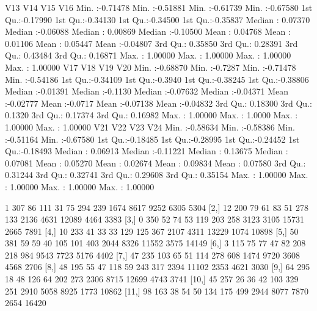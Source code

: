 \documentclass[a4paper]{ article}
\begin{document}
\begin{table}[H]
\begin{Schunk}
\begin{Soutput}
      V13                V14                V15                V16          
 Min.   :-0.71478   Min.   :-0.51881   Min.   :-0.61739   Min.   :-0.67580  
 1st Qu.:-0.17990   1st Qu.:-0.34130   1st Qu.:-0.34500   1st Qu.:-0.35837  
 Median : 0.07370   Median :-0.06088   Median : 0.00869   Median :-0.10500  
 Mean   : 0.04768   Mean   : 0.01106   Mean   : 0.05447   Mean   :-0.04807  
 3rd Qu.: 0.35850   3rd Qu.: 0.28391   3rd Qu.: 0.43484   3rd Qu.: 0.16871  
 Max.   : 1.00000   Max.   : 1.00000   Max.   : 1.00000   Max.   : 1.00000  
      V17                V18               V19                V20          
 Min.   :-0.68870   Min.   :-0.7287   Min.   :-0.71478   Min.   :-0.54186  
 1st Qu.:-0.34109   1st Qu.:-0.3940   1st Qu.:-0.38245   1st Qu.:-0.38806  
 Median :-0.01391   Median :-0.1130   Median :-0.07632   Median :-0.04371  
 Mean   :-0.02777   Mean   :-0.0717   Mean   :-0.07138   Mean   :-0.04832  
 3rd Qu.: 0.18300   3rd Qu.: 0.1320   3rd Qu.: 0.17374   3rd Qu.: 0.16982  
 Max.   : 1.00000   Max.   : 1.0000   Max.   : 1.00000   Max.   : 1.00000  
      V21                V22                V23                V24          
 Min.   :-0.58634   Min.   :-0.58386   Min.   :-0.51164   Min.   :-0.67580  
 1st Qu.:-0.18485   1st Qu.:-0.28995   1st Qu.:-0.24452   1st Qu.:-0.18493  
 Median : 0.06913   Median :-0.11221   Median : 0.13675   Median : 0.07081  
 Mean   : 0.05270   Mean   : 0.02674   Mean   : 0.09834   Mean   : 0.07580  
 3rd Qu.: 0.31244   3rd Qu.: 0.32741   3rd Qu.: 0.29608   3rd Qu.: 0.35154  
 Max.   : 1.00000   Max.   : 1.00000   Max.   : 1.00000   Max.   : 1.00000  
\end{Soutput}
\begin{Soutput}
      [,1] [,2] [,3] [,4] [,5] [,6] [,7] [,8] [,9] [,10] [,11] [,12] [,13]
 [1,]    1  307   86  111   31   75  294  239 1674  8617  9252  6305  5304
 [2,]   12  200   79   61   83   51  278  133 2136  4631 12089  4464  3383
 [3,]    0  350   52   74   53  119  203  258 3123  3105 15731  2665  7891
 [4,]   10  233   41   33   33  129  125  367 2107  4311 13229  1074 10898
 [5,]   50  381   59   59   40  105  101  403 2044  8326 11552  3575 14149
 [6,]    3  115   75   77   47   82  208  218  984  9543  7723  5176  4402
 [7,]   47  235  103   65   51  114  278  608 1474  9720  3608  4568  2706
 [8,]   48  195   55   47  118   59  243  317 2394 11102  2353  4621  3030
 [9,]   64  295   18   48  126   64  202  273 2306  8715 12699  4743  3741
[10,]   45  257   26   36   42  103  329  251 2910  5058  8925  1773 10862
[11,]   98  163   38   54   50  134  175  499 2944  8077  7870  2654 16420

\end{Soutput}
\end{Schunk}
\end{table}
\end{document}
